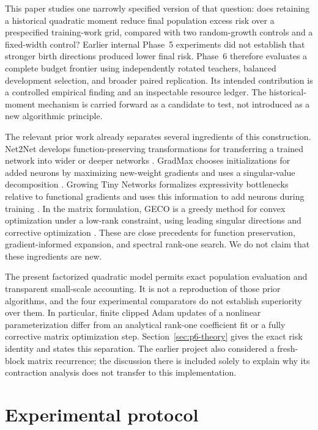 \documentclass[10pt]{article}
\begin{document}
This paper studies one narrowly specified version of that question:
does retaining a historical quadratic moment reduce final population
excess risk over a prespecified training-work grid, compared with two
random-growth controls and a fixed-width control? Earlier internal
Phase~5 experiments did not establish that stronger birth directions
produced lower final risk. Phase~6 therefore evaluates a complete budget
frontier using independently rotated teachers, balanced development
selection, and broader paired replication. Its intended contribution
is a controlled empirical finding and an inspectable resource ledger.
The historical-moment mechanism is carried forward as a candidate to
test, not introduced as a new algorithmic principle.

The relevant prior work already separates several ingredients of this
construction. Net2Net develops function-preserving transformations for
transferring a trained network into wider or deeper networks
\cite{net2net}. GradMax chooses initializations for added neurons by
maximizing new-weight gradients and uses a singular-value decomposition
\cite{gradmax}. Growing Tiny Networks formalizes expressivity
bottlenecks relative to functional gradients and uses this information
to add neurons during training \cite{tiny}. In the matrix formulation,
GECO is a greedy method for convex optimization under a low-rank
constraint, using leading singular directions and corrective optimization
\cite{geco}. These are close precedents for function preservation,
gradient-informed expansion, and spectral rank-one search. We do not
claim that these ingredients are new.

The present factorized quadratic model permits exact population
evaluation and transparent small-scale accounting. It is not a
reproduction of those prior algorithms, and the four experimental
comparators do not establish superiority over them. In particular,
finite clipped Adam updates of a nonlinear parameterization differ
from an analytical rank-one coefficient fit or a fully corrective
matrix optimization step. Section~\ref{sec:p6-theory} gives the exact
risk identity and states this separation. The earlier project also
considered a fresh-block matrix recurrence; the discussion there is
included solely to explain why its contraction analysis does not
transfer to this implementation.



\section{Experimental protocol}
\label{sec:methods}
\end{document}
